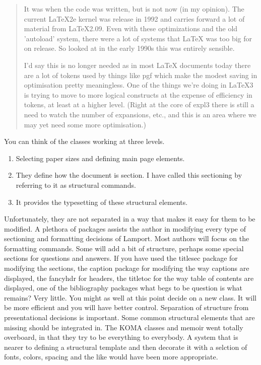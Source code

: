 \begin{quotation}
It was when the code was written, but is not now (in my opinion). The current LaTeX2e kernel was release in 1992 and carries forward a lot of material from LaTeX2.09. Even with these optimizations and the old 'autoload' system, there were a lot of systems that LaTeX was too big for on release. So looked at in the early 1990s this was entirely sensible.

I'd say this is no longer needed as in most LaTeX documents today there are a lot of tokens used by things like pgf which make the modest saving in optimisation pretty meaningless. One of the things we're doing in LaTeX3 is trying to move to more logical constructs at the expense of efficiency in tokens, at least at a higher level. (Right at the core of expl3 there is still a need to watch the number of expansions, etc., and this is an area where we may yet need some more optimisation.)

\end{quotation}

You can think of the \latex classes working at three levels. 

\begin{enumerate}
\item Selecting paper sizes and defining main page elements.
\item They define how the document is section. I have called this sectioning by referring to it as structural commands.
\item It provides the typesetting of these structural elements.
\end{enumerate}

Unfortunately, they are not separated in a way that makes it easy for them to be modified. A plethora of packages assists the author in modifying every type of sectioning and formatting decisions of Lamport. Most authors will focus on the formatting commands. Some will add a bit of structure, perhaps some special sections for questions and answers. If you have used the titlesec package for modifying the sections, the caption package for modifying the way captions are displayed, the fancyhdr for headers, the titletoc for the way table of contents are displayed, one of the bibliography packages what begs to be question is what remains? Very little. You might as well at this point decide on a new class. It will be more efficient and you will have better control. Separation of structure from presentational decisions is important. Some common structural elements that are missing should be integrated in. The KOMA classes and memoir went totally overboard, in that they try to be everything to everybody. A system that is nearer to defining a structural template and then decorate it with a selction of fonts, colors, spacing and the like would have been more appropriate.

